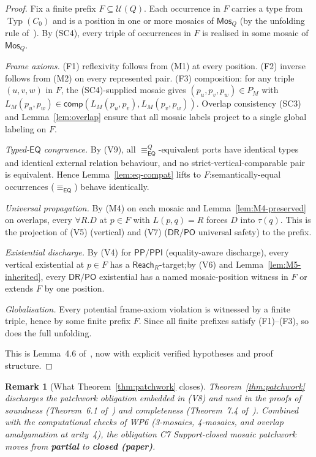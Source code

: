 \documentclass[11pt]{article}
\newtheorem{remark}[theorem]{Remark}
\newcommand{\Typ}{\operatorname{Typ}}
\newcommand{\EQ}{\mathsf{EQ}}
\newcommand{\PP}{\mathsf{PP}}
\newcommand{\PPI}{\mathsf{PPI}}
\newcommand{\PO}{\mathsf{PO}}
\newcommand{\DR}{\mathsf{DR}}
\newcommand{\comp}{\mathsf{comp}}
\newcommand{\eqrel}{\equiv_{\EQ}}
\newcommand{\eqQ}{\equiv_{\EQ}^{Q}}
\newcommand{\Mos}{\mathsf{Mos}}
\newcommand{\Reach}{\mathrel{\mathsf{Reach}}}
\newcommand{\PARTIAL}{\textcolor{black!60!orange}{\textbf{partial}}}
\newcommand{\CLOSED}{\textcolor{black!70!green}{\textbf{closed (paper)}}}
\begin{document}
\begin{proof}
Fix a finite prefix \(F \subseteq \mathcal U(Q)\).  Each
occurrence in \(F\) carries a type from \(\Typ(C_0)\) and is a
position in one or more mosaics of \(\Mos_Q\) (by the
unfolding rule of~\cite[\S4.5]{repaired}).  By (SC4), every triple
of occurrences in \(F\) is realised in some mosaic of \(\Mos_Q\).

\emph{Frame axioms.}  (F1) reflexivity follows from (M1) at every
position.  (F2) inverse follows from (M2) on every represented
pair.  (F3) composition: for any triple \((u,v,w)\) in \(F\),
the (SC4)-supplied mosaic gives \((p_u, p_v, p_w) \in P_M\) with
\(L_M(p_u, p_w) \in \comp(L_M(p_u, p_v), L_M(p_v, p_w))\).
Overlap consistency (SC3) and Lemma~\ref{lem:overlap} ensure that
all mosaic labels project to a single global labeling on \(F\).

\emph{Typed-\(\EQ\) congruence.}  By (V9), all \(\eqQ\)-equivalent
ports have identical types and identical external relation behaviour,
and no strict-vertical-comparable pair is equivalent.  Hence
Lemma~\ref{lem:eq-compat} lifts to \(F\):\@ semantically-equal
occurrences (\(\eqrel\)) behave identically.

\emph{Universal propagation.}  By (M4) on each mosaic and
Lemma~\ref{lem:M4-preserved} on overlaps, every \(\forall R.D\) at
\(p \in F\) with \(L(p,q) = R\) forces \(D\) into \(\tau(q)\).
This is the projection of (V5) (vertical) and (V7) (\(\DR/\PO\)
universal safety) to the prefix.

\emph{Existential discharge.}  By (V4) for \(\PP/\PPI\) (equality-aware
discharge), every vertical existential at \(p \in F\) has a
\(\Reach_R\)-target;\@ by (V6) and Lemma~\ref{lem:M5-inherited},
every \(\DR/\PO\) existential has a named mosaic-position witness in
\(F\) or extends \(F\) by one position.

\emph{Globalisation.}  Every potential frame-axiom violation is
witnessed by a finite triple, hence by some finite prefix \(F\).
Since all finite prefixes satisfy (F1)--(F3), so does the full
unfolding.

This is Lemma~4.6 of~\cite{repaired}, now with explicit verified
hypotheses and proof structure.
\end{proof}

\begin{remark}[What Theorem~\ref{thm:patchwork} closes]
Theorem~\ref{thm:patchwork} discharges the patchwork obligation
embedded in (V8) and used in the proofs of soundness
(Theorem~6.1 of~\cite{repaired}) and completeness
(Theorem~7.4 of~\cite{repaired}).  Combined with the computational
checks of WP6 (3-mosaics, 4-mosaics, and overlap amalgamation at
arity~4), the obligation \emph{C7 Support-closed mosaic patchwork}
moves from \PARTIAL{} to \CLOSED{}.
\end{remark}
\end{document}
